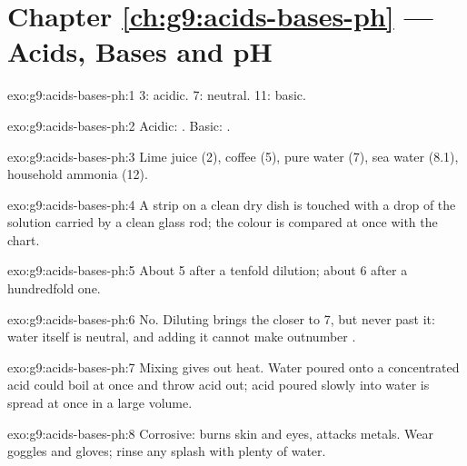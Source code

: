 \section*{Chapter \ref{ch:g9:acids-bases-ph} --- Acids, Bases and pH}

\begin{solution}{exo:g9:acids-bases-ph:1}
 3: acidic.  7: neutral.  11: basic.
\end{solution}

\begin{solution}{exo:g9:acids-bases-ph:2}
Acidic:  . Basic:  .
\end{solution}

\begin{solution}{exo:g9:acids-bases-ph:3}
Lime juice (2), coffee (5), pure water (7), sea water (8.1), household
ammonia (12).
\end{solution}

\begin{solution}{exo:g9:acids-bases-ph:4}
A strip on a clean dry dish is touched with a drop of the solution
carried by a clean glass rod; the colour is compared at once with the
chart.
\end{solution}

\begin{solution}{exo:g9:acids-bases-ph:5}
About 5 after a tenfold dilution; about 6 after a hundredfold one.
\end{solution}

\begin{solution}{exo:g9:acids-bases-ph:6}
No. Diluting brings the  closer to 7, but never past it: water itself
is neutral, and adding it cannot make   outnumber 
.
\end{solution}

\begin{solution}{exo:g9:acids-bases-ph:7}
Mixing gives out heat. Water poured onto a concentrated acid could boil
at once and throw acid out; acid poured slowly into water is spread at
once in a large volume.
\end{solution}

\begin{solution}{exo:g9:acids-bases-ph:8}
Corrosive: burns skin and eyes, attacks metals. Wear goggles and gloves;
rinse any splash with plenty of water.
\end{solution}

